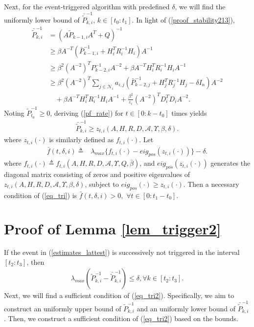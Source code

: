 \documentclass[journal,transmag]{IEEEtran}
\begin{document}
{	Next, for the event-triggered algorithm with predefined $\delta$, we will find the uniformly lower bound of $\bar{\tilde{P}}_{k,i}^{-1}$, $k\in [t_0:t_1]$. In light of (\ref{proof_stability213}), 
	\begin{align}\label{pf_rate}
	\bar{\tilde{P}}_{k,i}^{-1}&=(A\tilde P_{k-1,i}A^T+Q)^{-1}\\
	&\geq  \beta A^{-T}(\bar P_{k-1,i}^{-1}+H_{i}^TR_{i}^{-1}H_{i})A^{-1}\nonumber\\
	&\geq  \beta^2 (A^{-2})^{T} P_{k-2,i}^{-1}A^{-2}+ \beta A^{-T}H_{i}^TR_{i}^{-1}H_{i}A^{-1}\nonumber\\
	&\geq \beta^2 (A^{-2})^{T} \sum_{j\in \mathcal{N}_{i}}a_{i,j}(\bar P_{k-2,j}^{-1}+H_{j}^TR_{j}^{-1}H_{j}-\delta I_n)A^{-2}\nonumber\\
	&\quad+ \beta A^{-T}H_{i}^TR_{i}^{-1}H_{i}A^{-1}+ \frac{\beta^2}{\varepsilon_i }(A^{-2})^{T}D_{i}^TD_{i}A^{-2}\nonumber.
	\end{align}
	Noting $\tilde P_{t_0}^{-1}\geq 0$, 
	deriving (\ref{pf_rate}) for $t\in [0:k-t_0]$  times yields 
	\begin{align}\label{eq_lower}
	\bar{\tilde{P}}_{k,i}^{-1}\geq z_{ t,i}(A,H,R,D,\mathcal{A},\Upsilon, \beta,\delta).
	\end{align}
	where $z_{ t,i}(\cdot )$ is similarly defined as $f_{ t,i}(\cdot)$.
	Let
	\begin{align}\label{eq_ferror}
	\bar f(t,\delta,i)\triangleq &\lambda_{max}\{f_{t,i}(\cdot)-eig_{pos}(z_{t,i}(\cdot))\}-\delta.
	\end{align}
	where $f_{t,i}(\cdot)\triangleq f_{t,i} (A,H,R,D,\mathcal{A},\Upsilon,Q,\bar\beta)$, and $eig_{pos}(z_{t,i}(\cdot))$ generates the diagonal matrix consisting of zeros and positive eigenvalues of $z_{ t,i}(A,H,R,D,\mathcal{A},\Upsilon, \beta,\delta)$, subject to $eig_{pos}(\cdot)\geq z_{ t,i}(\cdot).$
	Then a necessary condition of (\ref{eq_tri}) is 
	$\bar f(t,\delta,i)>0,$ $\forall t\in  [0:t_1-t_0]$.
\section{Proof of Lemma \ref{lem_trigger2}}\label{pf_lemma_tri2}
		If the event in (\ref{estimates_lattest}) is successively not triggered in the interval $[t_2:t_3]$, then
		\begin{align}\label{eq_tri2}
		\lambda_{max}(\tilde P_{k,i}^{-1}-\bar{\tilde{P}}_{k,i}^{-1})\leq \delta , \forall k\in [t_2:t_3].
		\end{align}
		Next, we will find a sufficient condition of (\ref{eq_tri2}). Specifically, we aim to construct an uniformly upper bound of $\tilde P_{k,i}^{-1}$ and an uniformly lower bound of $\bar{\tilde{P}}_{k,i}^{-1}$. Then, we construct a sufficient condition of (\ref{eq_tri2}) based on the bounds.
		
}
\end{document}
